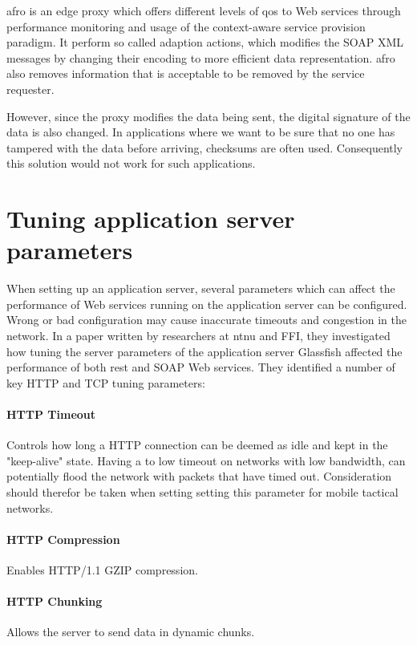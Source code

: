 \gls{afro} is an edge proxy which offers different levels of \gls{qos} to Web
services through performance monitoring and usage of the context-aware
service provision paradigm\cite{ist-090}. It perform so called adaption actions, which
modifies the SOAP XML messages by changing their encoding to more efficient data
representation. \gls{afro} also removes information that is acceptable to be removed by
the service requester.

However, since the proxy modifies the data being sent, the digital signature of
the data is also changed. In applications where we want to be sure that no one
has tampered with the data before arriving, checksums are often used.
Consequently this solution would not work for such applications.


\section{Tuning application server parameters}

When setting up an application server, several parameters which can affect the
performance of Web services running on the application server can be configured.
Wrong or bad configuration may cause inaccurate timeouts and congestion in the
network. In a paper written by researchers at \gls{ntnu} and
FFI\cite{johnsen-bloebaum-recommendations-web-services-tactical-domain}, they
investigated how tuning the server parameters of the application server
Glassfish affected the performance of both \gls{rest} and SOAP Web services.
They identified a number of key HTTP and TCP tuning parameters:

\paragraph{HTTP Timeout} Controls how long a HTTP connection can be deemed as
idle and kept in the "keep-alive" state. Having a to low timeout on networks
with low bandwidth, can potentially flood the network with packets that have
timed out. Consideration should therefor be taken when setting setting this
parameter for mobile tactical networks.

\paragraph{HTTP Compression} Enables HTTP/1.1 GZIP compression.

\paragraph{HTTP Chunking} Allows the server to send data in dynamic chunks.

